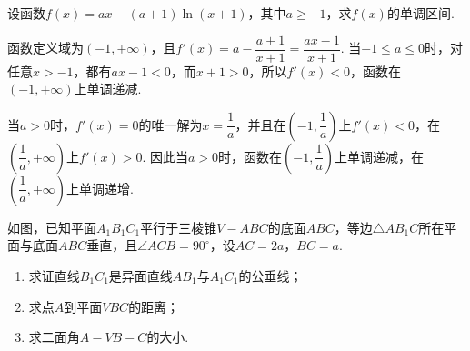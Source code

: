 \begin{problem}
设函数\(f(x)=ax-(a+1)\ln(x+1)\)，其中\(a\geqslant-1\)，求\(f(x)\)的单调区间.
\end{problem}

\begin{solution}
函数定义域为\((-1,+\infty)\)，且\(f'(x)=a-\dfrac{a+1}{x+1}=\dfrac{ax-1}{x+1}\).
当\(-1\leqslant a\leqslant0\)时，对任意\(x>-1\)，都有\(ax-1<0\)，而\(x+1>0\)，所以\(f'(x)<0\)，函数在\((-1,+\infty)\)上单调递减.

当\(a>0\)时，\(f'(x)=0\)的唯一解为\(x=\dfrac1a\)，并且在\(\left(-1,\dfrac1a\right)\)上\(f'(x)<0\)，在\(\left(\dfrac1a,+\infty\right)\)上\(f'(x)>0\).
因此当\(a>0\)时，函数在\(\left(-1,\dfrac1a\right)\)上单调递减，在\(\left(\dfrac1a,+\infty\right)\)上单调递增.
\end{solution}

\begin{problem}
如图，已知平面\(A_1B_1C_1\)平行于三棱锥\(V-ABC\)的底面\(ABC\)，等边\(\triangle AB_1C\)所在平面与底面\(ABC\)垂直，且\(\angle ACB=90^\circ\)，设\(AC=2a\)，\(BC=a\).

\begin{enumerate}
\item 求证直线\(B_1C_1\)是异面直线\(AB_1\)与\(A_1C_1\)的公垂线；
\item 求点\(A\)到平面\(VBC\)的距离；
\item 求二面角\(A-VB-C\)的大小.
\end{enumerate}

\end{problem}

